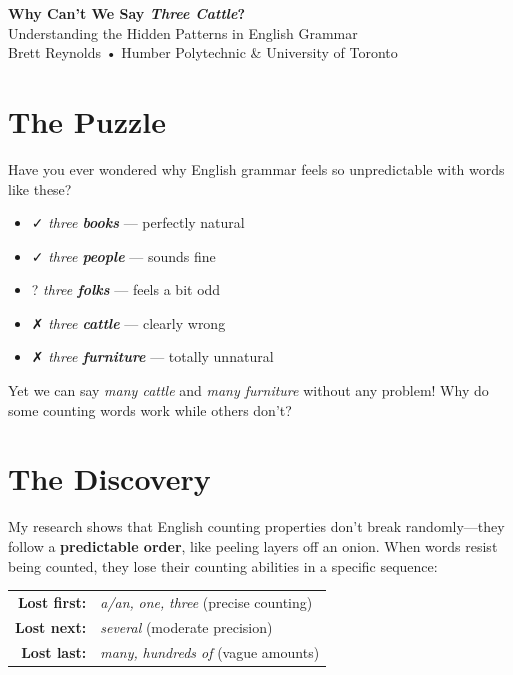 \documentclass[11pt,a4paper]{article}
\begin{document}
\begin{center}
{\Huge\bfseries\color{maincolor} Why Can't We Say \textit{Three Cattle}?}\\[0.5em]
{\Large Understanding the Hidden Patterns in English Grammar}\\[1em]
{\large Brett Reynolds • Humber Polytechnic \& University of Toronto}
\end{center}

\vspace{0.5em}

\section*{The Puzzle}

Have you ever wondered why English grammar feels so unpredictable with words like these?

\begin{tcolorbox}[colback=highlightcolor,colframe=maincolor,boxrule=0.5pt]
\begin{itemize}[itemsep=0pt]
\item ✓ \textit{three \textbf{books}} — perfectly natural
\item ✓ \textit{three \textbf{people}} — sounds fine
\item ? \textit{three \textbf{folks}} — feels a bit odd
\item ✗ \textit{three \textbf{cattle}} — clearly wrong
\item ✗ \textit{three \textbf{furniture}} — totally unnatural
\end{itemize}
\end{tcolorbox}

Yet we can say \textit{many cattle} and \textit{many furniture} without any problem! Why do some counting words work while others don't?

\section*{The Discovery}

My research shows that English counting properties don't break randomly—they follow a \textbf{predictable order}, like peeling layers off an onion. When words resist being counted, they lose their counting abilities in a specific sequence:

\begin{center}
\begin{tabular}{rl}
\textbf{Lost first:} & \textit{a/an,} \textit{one,} \textit{three} (precise counting) \\
\textbf{Lost next:} & \textit{several} (moderate precision) \\
\textbf{Lost last:} & \textit{many,} \textit{hundreds of} (vague amounts) \\
\end{tabular}
\end{center}
\end{document}
